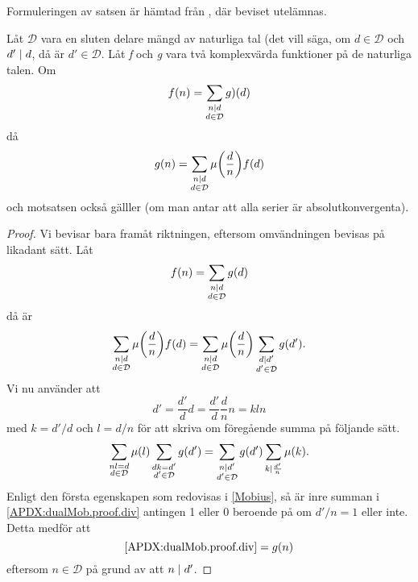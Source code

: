 Formuleringen av satsen är hämtad från \cite[Sats 1.2.3]{cojocarumurty}, där beviset utelämnas.
\begin{theorem}\label{APDX:mobDual}
Låt \(\mathcal{D}\) vara en sluten delare mängd av naturliga tal (det vill säga, om \(d \in \mathcal{D}\) och \(d'\mid d\), då är \(d'\in \mathcal{D}\). Låt \textit{f} och \textit{g} vara två komplexvärda funktioner på de naturliga talen. Om
\begin{equation}
    f(n)=\sum_{\substack{n\mid d\\d\in \mathcal{D}}}g)(d)\nonumber
\end{equation}
då
\begin{equation}
    g(n) = \sum_{\substack{n\mid d\\d\in \mathcal{D}}}\mu\bigg(\frac{d}{n}\bigg)f(d)\nonumber
\end{equation}
och motsatsen också gälller (om man antar att alla serier är absolutkonvergenta).
\end{theorem}
\begin{proof}
Vi bevisar bara framåt riktningen, eftersom omvändningen  bevisas  på likadant sätt. Låt
\begin{equation}
    f(n)=\sum_{\substack{n\mid d\\d\in \mathcal{D}}}g(d)\nonumber
\end{equation}
då är
\begin{equation}
    \sum_{\substack{n\mid d\\d\in \mathcal{D}}}\mu\bigg(\frac{d}{n}\bigg)f(d) = \sum_{\substack{n\mid d\\d\in \mathcal{D}}}\mu\bigg(\frac{d}{n}\bigg)\sum_{\substack{d\mid d'\\d'\in \mathcal{D}}}g(d').\nonumber
\end{equation}
Vi nu använder att
\begin{equation}
    d' = \frac{d'}{d}d = \frac{d'}{d}\frac{d}{n}n = kln\nonumber
\end{equation}
med \(k = d'/d\) och \(l = d/n\) för att skriva om föregående summa på följande sätt.
\begin{equation}
    \sum_{\substack{nl = d\\d\in \mathcal{D}}}\mu(l)\sum_{\substack{dk= d'\\d'\in \mathcal{D}}}g(d') = \sum_{\substack{n \mid d'\\d'\in \mathcal{D}}}g(d')\sum_{k\mid \frac{d'}{n}}\mu(k).\label{APDX:dualMob.proof.div}
\end{equation}
Enligt den första egenskapen som redovisas i \ref{Mobius}, så är inre summan i \eqref{APDX:dualMob.proof.div} antingen 1 eller 0 beroende på om \(d'/n = 1\) eller inte. Detta medför att
\begin{equation}
    \eqref{APDX:dualMob.proof.div} = g(n)\nonumber
\end{equation}
eftersom \(n \in \mathcal{D}\) på grund av att \(n \mid d'\).
\end{proof}
